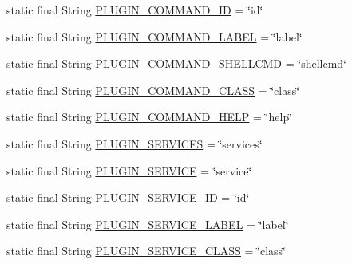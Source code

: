 \begin{DoxyCompactItemize}
\item 
static final String \hyperlink{interfaceorg_1_1tzi_1_1use_1_1runtime_1_1util_1_1_i_plugin_parser_symbols_a647cf3b6f8b0f08643be0ba95db54d5f}{P\-L\-U\-G\-I\-N\-\_\-\-C\-O\-M\-M\-A\-N\-D\-\_\-\-I\-D} = \char`\"{}id\char`\"{}
\item 
static final String \hyperlink{interfaceorg_1_1tzi_1_1use_1_1runtime_1_1util_1_1_i_plugin_parser_symbols_a5e6c0f1ba8c81b544867153d826f33d2}{P\-L\-U\-G\-I\-N\-\_\-\-C\-O\-M\-M\-A\-N\-D\-\_\-\-L\-A\-B\-E\-L} = \char`\"{}label\char`\"{}
\item 
static final String \hyperlink{interfaceorg_1_1tzi_1_1use_1_1runtime_1_1util_1_1_i_plugin_parser_symbols_ad5fcb92ed0178751ead39bc27f98b9e3}{P\-L\-U\-G\-I\-N\-\_\-\-C\-O\-M\-M\-A\-N\-D\-\_\-\-S\-H\-E\-L\-L\-C\-M\-D} = \char`\"{}shellcmd\char`\"{}
\item 
static final String \hyperlink{interfaceorg_1_1tzi_1_1use_1_1runtime_1_1util_1_1_i_plugin_parser_symbols_ab5b3354da87988d8c1906fc0dbaa8aee}{P\-L\-U\-G\-I\-N\-\_\-\-C\-O\-M\-M\-A\-N\-D\-\_\-\-C\-L\-A\-S\-S} = \char`\"{}class\char`\"{}
\item 
static final String \hyperlink{interfaceorg_1_1tzi_1_1use_1_1runtime_1_1util_1_1_i_plugin_parser_symbols_a0e79c03a4aca9efcf95f7ef90da36d5c}{P\-L\-U\-G\-I\-N\-\_\-\-C\-O\-M\-M\-A\-N\-D\-\_\-\-H\-E\-L\-P} = \char`\"{}help\char`\"{}
\item 
static final String \hyperlink{interfaceorg_1_1tzi_1_1use_1_1runtime_1_1util_1_1_i_plugin_parser_symbols_a4690f1dce57a951f591575fa43c5c301}{P\-L\-U\-G\-I\-N\-\_\-\-S\-E\-R\-V\-I\-C\-E\-S} = \char`\"{}services\char`\"{}
\item 
static final String \hyperlink{interfaceorg_1_1tzi_1_1use_1_1runtime_1_1util_1_1_i_plugin_parser_symbols_ada058aeef60399edb36081c1dfd703a1}{P\-L\-U\-G\-I\-N\-\_\-\-S\-E\-R\-V\-I\-C\-E} = \char`\"{}service\char`\"{}
\item 
static final String \hyperlink{interfaceorg_1_1tzi_1_1use_1_1runtime_1_1util_1_1_i_plugin_parser_symbols_a769ac24ccdf04a6f2354877f41a2a43f}{P\-L\-U\-G\-I\-N\-\_\-\-S\-E\-R\-V\-I\-C\-E\-\_\-\-I\-D} = \char`\"{}id\char`\"{}
\item 
static final String \hyperlink{interfaceorg_1_1tzi_1_1use_1_1runtime_1_1util_1_1_i_plugin_parser_symbols_a359c30deece5e0007534724263dc05b3}{P\-L\-U\-G\-I\-N\-\_\-\-S\-E\-R\-V\-I\-C\-E\-\_\-\-L\-A\-B\-E\-L} = \char`\"{}label\char`\"{}
\item 
static final String \hyperlink{interfaceorg_1_1tzi_1_1use_1_1runtime_1_1util_1_1_i_plugin_parser_symbols_ac30c2ea92ec53acde623cea120eae52e}{P\-L\-U\-G\-I\-N\-\_\-\-S\-E\-R\-V\-I\-C\-E\-\_\-\-C\-L\-A\-S\-S} = \char`\"{}class\char`\"{}

\end{DoxyCompactItemize}
